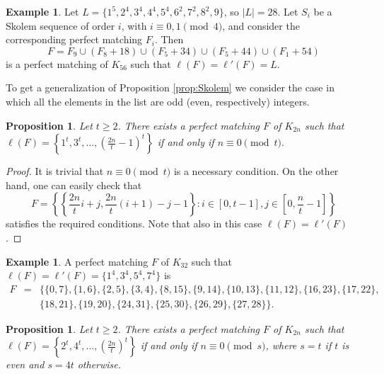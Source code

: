 \documentclass{amsart}
\newtheorem{prop}[defi]{Proposition}
\theoremstyle{definition}
\newtheorem{ex}[defi]{Example}
\numberwithin{equation}{section}
\begin{document}
\begin{ex}
Let $L=\{1^5,2^4,3^4,4^4,5^4,6^2,7^2,8^2,9\}$, so $|L|=28$.
Let $S_i$ be a Skolem sequence of order $i$, with $i\equiv 0,1\pmod 4$,  and consider the corresponding perfect matching $F_i$.
Then $$F=F_9\cup(F_8+18)\cup (F_5+34)\cup (F_5+44) \cup (F_1+54)$$
is a perfect matching of $K_{56}$ such that  $\ell(F)=\ell'(F)=L$.
\end{ex}

To get a generalization of Proposition \ref{prop:Skolem} we consider the case in which all the elements in the list are odd (even, respectively)
integers.

\begin{prop}\label{prop:odd}
Let $t\geq 2$.
There exists a perfect matching $F$ of $K_{2n}$ such that $\ell(F)=\left\{1^t,3^t,\ldots,(\frac{2n}{t}-1)^t\right\}$
if and only if $n\equiv 0 \pmod t.$
\end{prop}
\begin{proof}
It is trivial that $n\equiv 0 \pmod t$ is a necessary condition.
On the other hand, one can easily check that
$$F=\left\{\left\{ \frac{2n}{t}i+j, \frac{2n}{t}(i+1)-j-1 \right\} : i\in[0,t-1], j\in\left[0,\frac{n}{t}-1\right]\right\}$$
satisfies the required conditions. Note that also in this case $\ell(F)=\ell'(F)$.
\end{proof}

\begin{ex}\label{ex:odd}
A perfect matching $F$ of $K_{32}$ such that $\ell(F)=\ell'(F)=\{1^4,3^4,5^4,7^4\}$ is
$$\begin{array}{rcl}
F&=&\{\{0,7\},\{1,6\},\{2,5\},\{3,4\},\{8,15\},\{9,14\},\{10,13\},\{11,12\},\{16,23\},\{17,22\},\\
&&\{18,21\},\{19,20\},\{24,31\},\{25,30\},\{26,29\},\{27,28\}\}.
\end{array}$$
\end{ex}

\begin{prop}\label{prop:even}
Let $t\geq 2$. There exists a perfect matching $F$ of $K_{2n}$ such that $\ell(F)=\left\{2^t,4^t,\ldots, \left(\frac{2n}{t}\right)^t\right\}$
if and only if $n\equiv 0 \pmod s$, where $s=t$ if $t$ is even and $s=4t$ otherwise.
\end{prop}
\end{document}
